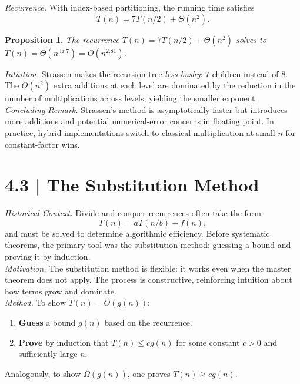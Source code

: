 \documentclass[12pt]{article}
\newcommand{\microhead}[1]{\vspace{0.45em}\noindent\textit{#1}}
\newtheorem{proposition}[theorem]{Proposition}
\theoremstyle{definition}
\begin{document}
\microhead{Recurrence.} With index-based partitioning, the running time satisfies
\[
T(n)=7T(n/2)+\Theta(n^2).
\]

\begin{proposition}
The recurrence $T(n)=7T(n/2)+\Theta(n^2)$ solves to $T(n)=\Theta(n^{\lg 7})=O(n^{2.81})$.
\end{proposition}

\microhead{Intuition.} Strassen makes the recursion tree \emph{less bushy}: $7$ children instead of $8$. The $\Theta(n^2)$ extra additions at each level are dominated by the reduction in the number of multiplications across levels, yielding the smaller exponent. \\

\microhead{Concluding Remark.} Strassen’s method is asymptotically faster but introduces more additions and potential numerical-error concerns in floating point. In practice, hybrid implementations switch to classical multiplication at small $n$ for constant-factor wins. \\

\newpage

\dotfill
\section*{4.3 | The Substitution Method}
\dotfill

\microhead{Historical Context.} Divide-and-conquer recurrences often take the form 
\[
T(n) = aT(n/b) + f(n),
\]
and must be solved to determine algorithmic efficiency. Before systematic theorems, the primary tool was the substitution method: guessing a bound and proving it by induction. \\

\microhead{Motivation.} The substitution method is flexible: it works even when the master theorem does not apply. The process is constructive, reinforcing intuition about how terms grow and dominate. \\

\microhead{Method.} To show $T(n) = O(g(n))$:
\begin{enumerate}
\item \textbf{Guess} a bound $g(n)$ based on the recurrence.
\item \textbf{Prove} by induction that $T(n) \le c g(n)$ for some constant $c > 0$ and sufficiently large $n$.
\end{enumerate}
Analogously, to show $\Omega(g(n))$, one proves $T(n) \ge c g(n)$. \\
\end{document}
